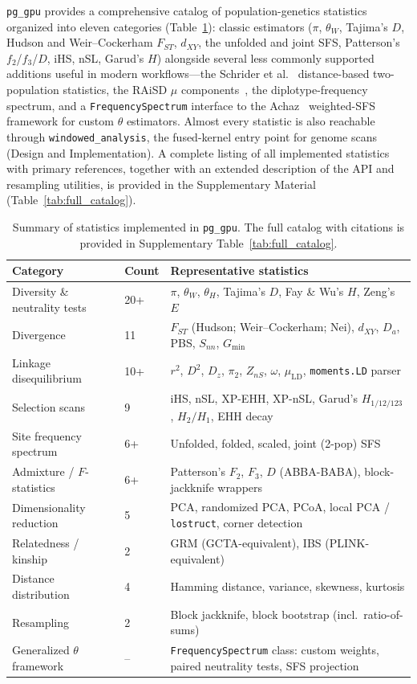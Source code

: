 \documentclass[12pt]{article}
\newcommand{\citep}{\parencite}
\newcommand{\pggpu}{\texttt{pg\_gpu}\xspace}
\newcommand{\lostruct}{\texttt{lostruct}\xspace}
\begin{document}
\pggpu provides a comprehensive catalog of population-genetics
statistics organized into eleven categories
(Table~\ref{tab:features}): classic estimators ($\pi$, $\theta_W$,
Tajima's $D$, Hudson and Weir--Cockerham $F_{ST}$, $d_{XY}$, the
unfolded and joint SFS, Patterson's $f_2$/$f_3$/$D$, iHS, nSL, Garud's
$H$) alongside several less commonly supported additions useful in
modern workflows---the Schrider et al.~\citep{schrider2018}
distance-based two-population statistics, the RAiSD
$\mu$ components~\citep{alachiotis2018}, the diplotype-frequency
spectrum, and a \texttt{FrequencySpectrum} interface to the
Achaz~\citep{achaz2009} weighted-SFS framework for custom $\theta$
estimators. Almost every statistic is also reachable through
\texttt{windowed\_analysis}, the fused-kernel entry point for genome
scans (Design and Implementation). A complete listing of all
implemented statistics with primary references, together with an
extended description of the API and resampling utilities, is provided
in the Supplementary Material (Table~\ref{tab:full_catalog}).

\begin{table}[ht]
\centering
\small
\caption{Summary of statistics implemented in \pggpu. The full catalog with
citations is provided in Supplementary Table~\ref{tab:full_catalog}.}
\label{tab:features}
\begin{tabular}{llp{5.5cm}}
\toprule
\textbf{Category} & \textbf{Count} & \textbf{Representative statistics} \\
\midrule
Diversity \& neutrality tests & 20+ & $\pi$, $\theta_W$, $\theta_H$, Tajima's $D$, Fay \& Wu's $H$, Zeng's $E$ \\
Divergence & 11 & $F_{ST}$ (Hudson; Weir--Cockerham; Nei), $d_{XY}$, $D_a$, PBS, $S_{nn}$, $G_{\min}$ \\
Linkage disequilibrium & 10+ & $r^2$, $D^2$, $D_z$, $\pi_2$, $Z_{nS}$, $\omega$, $\mu_{\mathrm{LD}}$, \texttt{moments.LD} parser \\
Selection scans & 9 & iHS, nSL, XP-EHH, XP-nSL, Garud's $H_{1/12/123}$, $H_{2}/H_{1}$, EHH decay \\
Site frequency spectrum & 6+ & Unfolded, folded, scaled, joint (2-pop) SFS \\
Admixture / $F$-statistics & 6+ & Patterson's $F_2$, $F_3$, $D$ (ABBA-BABA), block-jackknife wrappers \\
Dimensionality reduction & 5 & PCA, randomized PCA, PCoA, local PCA / \lostruct, corner detection \\
Relatedness / kinship & 2 & GRM (GCTA-equivalent), IBS (PLINK-equivalent) \\
Distance distribution & 4 & Hamming distance, variance, skewness, kurtosis \\
Resampling & 2 & Block jackknife, block bootstrap (incl.\ ratio-of-sums) \\
Generalized $\theta$ framework & -- & \texttt{FrequencySpectrum} class: custom weights, paired neutrality tests, SFS projection \\
\bottomrule
\end{tabular}
\end{table}
\end{document}
